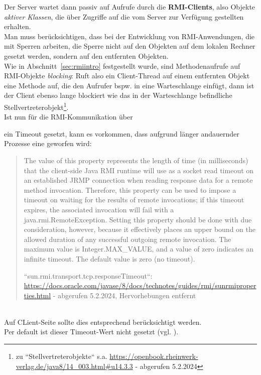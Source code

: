 \noindent
Der Server wartet dann passiv auf Aufrufe durch die \textbf{RMI-Clients}, also Objekte \textit{aktiver Klassen}, die über  Zugriffe auf die vom Server zur Verfügung gestellten  erhalten.\\

\noindent
Man muss berücksichtigen, dass bei der Entwicklung von RMI-Anwendungen, die mit Sperren arbeiten, die Sperre nicht auf den Objekten auf dem lokalen Rechner gesetzt werden, sondern auf den entfernten Objekten. \\
Wie in Abschnitt~\ref{sec:rmiintro} festgestellt wurde, sind Methodenaufrufe auf RMI-Objekte \textit{blocking}: Ruft also ein Client-Thread auf einem entfernten Objekt eine Methode auf, die den Aufrufer bspw. in eine Warteschlange einfügt, dann ist der Client ebenso lange blockiert wie das in der Warteschlange befindliche Stellvertreterobjekt\footnote{
zu ``Stellvertreterobjekte`` s.a. \url{https://openbook.rheinwerk-verlag.de/java8/14_003.html#u14.3.3} - abgerufen 5.2.2024
}.\\
Ist nun für die RMI-Kommunikation über \begin{center}\end{center} ein Timeout gesetzt, kann es vorkommen, dass aufgrund länger andauernder Prozesse eine  geworfen wird:

\blockquote[{``sun.rmi.transport.tcp.responseTimeout``: \url{https://docs.oracle.com/javase/8/docs/technotes/guides/rmi/sunrmiproperties.html} - abgerufen 5.2.2024, Hervorhebungen entfernt}]{
    The value of this property represents the length of time (in milliseconds) that the client-side Java RMI runtime will use as a socket read timeout on an established JRMP connection when reading response data for a remote method invocation. Therefore, this property can be used to impose a timeout on waiting for the results of remote invocations; if this timeout expires, the associated invocation will fail with a java.rmi.RemoteException. Setting this property should be done with due consideration, however, because it effectively places an upper bound on the allowed duration of any successful outgoing remote invocation. The maximum value is Integer.MAX\_VALUE, and a value of zero indicates an infinite timeout. The default value is zero (no timeout).
}\\

\noindent
Auf CLient-Seite sollte dies entsprechend berücksichtigt werden.\\
Per default ist dieser Timeout-Wert nicht gesetzt (vgl. \cite[359]{Oec22}).

